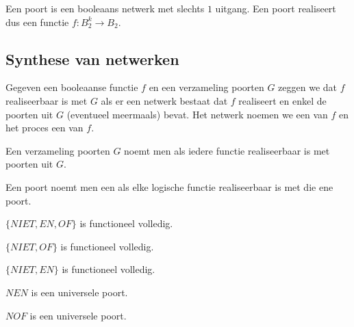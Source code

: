\documentclass[main.tex]{subfiles}
\begin{document}
\begin{de}
  Een poort is een booleaans netwerk met slechts $1$ uitgang.
  Een poort realiseert dus een functie $f:B_{2}^{k} \rightarrow B_{2}$.
\end{de}



\subsection{Synthese van netwerken}
\label{sec:synth-van-netw}

\begin{de}
  Gegeven een booleaanse functie $f$ en een verzameling poorten $G$ zeggen we dat $f$ realiseerbaar is met $G$ als er een netwerk bestaat dat $f$ realiseert en enkel de poorten uit $G$ (eventueel meermaals) bevat.
  Het netwerk noemen we een  van $f$ en het proces een  van $f$.
\end{de}

\begin{de}
  Een verzameling poorten $G$ noemt men  als iedere functie realiseerbaar is met poorten uit $G$.
\end{de}

\begin{de}
  Een poort noemt men een  als elke logische functie realiseerbaar is met die ene poort.
\end{de}

\begin{st}
  $\{NIET,EN,OF\}$ is functioneel volledig.
\end{st}

\begin{st}
  $\{NIET,OF\}$ is functioneel volledig.
\end{st}

\begin{st}
  $\{NIET,EN\}$ is functioneel volledig.
\end{st}

\begin{st}
  $NEN$ is een universele poort.
\end{st}

\begin{st}
  $NOF$ is een universele poort.
\end{st}
\end{document}
